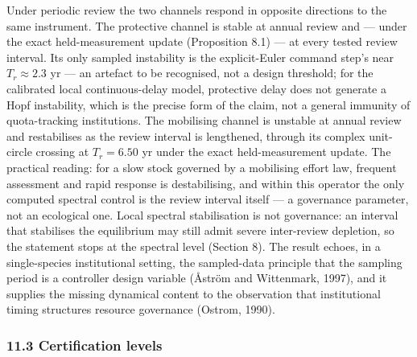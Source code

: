 \documentclass[11pt]{article}
\begin{document}
Under periodic review the two channels respond in opposite directions to
the same instrument. The protective channel is stable at annual review
and --- under the exact held-measurement update (Proposition 8.1) --- at
every tested review interval. Its only sampled instability is the
explicit-Euler command step's near \(T_r \approx 2.3\) yr --- an
artefact to be recognised, not a design threshold; for the calibrated
local continuous-delay model, protective delay does not generate a Hopf
instability, which is the precise form of the claim, not a general
immunity of quota-tracking institutions. The mobilising channel is
unstable at annual review and restabilises as the review interval is
lengthened, through its complex unit-circle crossing at \(T_r = 6.50\)
yr under the exact held-measurement update. The practical reading: for a
slow stock governed by a mobilising effort law, frequent assessment and
rapid response is destabilising, and within this operator the only
computed spectral control is the review interval itself --- a governance
parameter, not an ecological one. Local spectral stabilisation is not
governance: an interval that stabilises the equilibrium may still admit
severe inter-review depletion, so the statement stops at the spectral
level (Section 8). The result echoes, in a single-species institutional
setting, the sampled-data principle that the sampling period is a
controller design variable (\AA{}str\"om and Wittenmark, 1997), and it
supplies the missing dynamical content to the observation that
institutional timing structures resource governance (Ostrom, 1990).

\subsubsection{11.3 Certification levels}\label{certification-levels}
\end{document}
